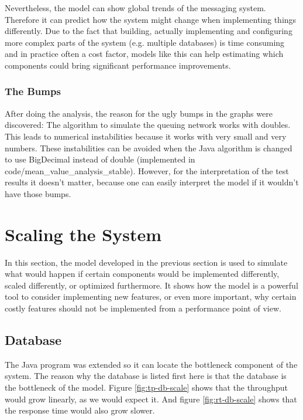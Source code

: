 \documentclass[a4paper]{article}
\begin{document}
Nevertheless, the model can show global trends of the messaging system. Therefore it can predict how the system might change when implementing things differently. Due to the fact that building, actually implementing and configuring more complex parts of the system (e.g. multiple databases) is time consuming and in practice often a cost factor, models like this can help estimating which components could bring significant performance improvements.\\

\subsubsection{The Bumps}

After doing the analysis, the reason for the ugly bumps in the graphs were discovered: The algorithm to simulate the queuing network works with doubles. This leads to numerical instabilities because it works with very small and very numbers. These instabilities can be avoided when the Java algorithm is changed to use BigDecimal instead of double (implemented in code/mean_value_analysis_stable). However, for the interpretation of the test results it doesn't matter, because one can easily interpret the model if it wouldn't have those bumps.\\


\pagebreak

\section{Scaling the System}

In this section, the model developed in the previous section is used to simulate what would happen if certain components would be implemented differently, scaled differently, or optimized furthermore. It shows how the model is a powerful tool to consider implementing new features, or even more important, why certain costly features should not be implemented from a performance point of view.\\


\subsection{Database}

The Java program was extended so it can locate the bottleneck component of the system. The reason why the database is listed first here is that the database is the bottleneck of the model. Figure \ref{fig:tp-db-scale} shows that the throughput would grow linearly, as we would expect it. And figure \ref{fig:rt-db-scale} shows that the response time would also grow slower.\\
\end{document}
